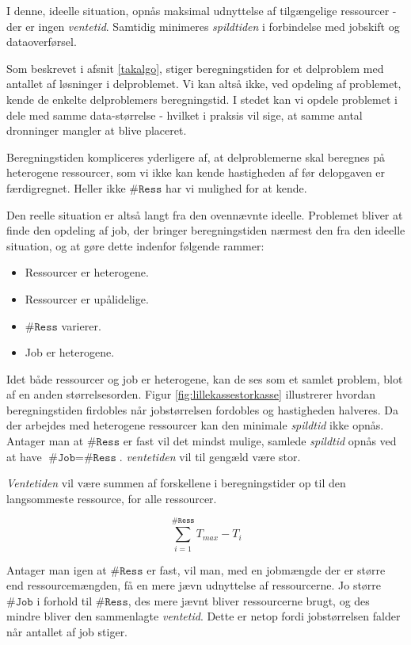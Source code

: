 \documentclass[final,a4paper,11pt]{article}
\begin{document}
I denne, ideelle situation, opnås maksimal udnyttelse af tilgængelige ressourcer - der er ingen \emph{ventetid}. Samtidig minimeres \emph{spildtiden} i forbindelse med jobskift og dataoverførsel.
 
Som beskrevet i afsnit \ref{takalgo}, stiger beregningstiden for et delproblem med antallet af løsninger i delproblemet. Vi kan altså ikke, ved opdeling af problemet, kende de enkelte delproblemers beregningstid. I stedet kan vi opdele problemet i dele med samme data-størrelse - hvilket i praksis vil sige, at samme antal dronninger mangler at blive placeret. 

Beregningstiden kompliceres yderligere af, at delproblemerne skal beregnes på heterogene ressourcer, som vi ikke kan kende hastigheden af før delopgaven er færdigregnet. Heller ikke $\texttt{\#Ress}$ har vi mulighed for at kende. 

Den reelle situation er altså langt fra den ovennævnte ideelle. Problemet bliver at finde den opdeling af job, der bringer beregningstiden nærmest den fra den ideelle situation, og at gøre dette indenfor følgende rammer:
\begin{itemize}
	\item Ressourcer er heterogene.
	\item Ressourcer er upålidelige.
	\item $\texttt{\#Ress}$ varierer.
	\item Job er heterogene.
\end{itemize}

Idet både ressourcer og job er heterogene, kan de ses som et samlet problem, blot af en anden størrelsesorden. Figur \ref{fig:lillekassestorkasse} illustrerer hvordan beregningstiden firdobles når jobstørrelsen fordobles og hastigheden halveres.
Da der arbejdes med heterogene ressourcer kan den minimale \emph{spildtid} ikke opnås. 
Antager man at $\texttt{\#Ress}$ er fast vil det mindst mulige, samlede \emph{spildtid} opnås ved at have $\texttt{\#Job} = \texttt{\#Ress}$. \emph{ventetiden} vil til gengæld være stor. 

\emph{Ventetiden} vil være summen af forskellene i beregningstider op til den langsommeste ressource, for alle ressourcer.   
 
\begin{displaymath}
	\sum_{i=1}^{\texttt{\#Ress}} T_{max} - T_{i} 
\end{displaymath}

Antager man igen at $\texttt{\#Ress}$ er fast, vil man, med en jobmængde der er større end ressourcemængden, få en mere jævn udnyttelse af ressourcerne. Jo større $\texttt{\#Job}$ i forhold til $\texttt{\#Ress}$, des mere jævnt bliver ressourcerne brugt, og des mindre bliver den sammenlagte \emph{ventetid}. Dette er netop fordi jobstørrelsen falder når antallet af job stiger. 
\end{document}
